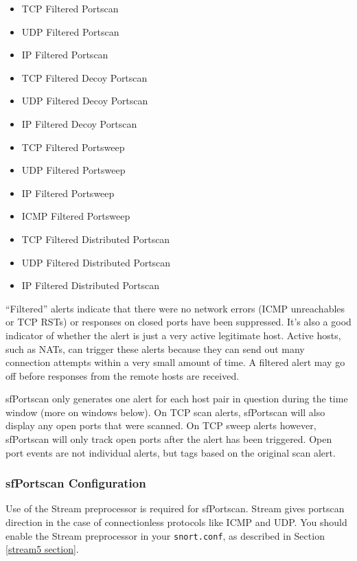 \documentclass[english]{report}
\begin{document}
\begin{itemize}
\item TCP Filtered Portscan
\item UDP Filtered Portscan
\item IP Filtered Portscan

\item TCP Filtered Decoy Portscan
\item UDP Filtered Decoy Portscan
\item IP Filtered Decoy Portscan

\item TCP Filtered Portsweep
\item UDP Filtered Portsweep
\item IP Filtered Portsweep
\item ICMP Filtered Portsweep

\item TCP Filtered Distributed Portscan
\item UDP Filtered Distributed Portscan
\item IP Filtered Distributed Portscan
\end{itemize}

``Filtered'' alerts indicate that there were no network errors (ICMP
unreachables or TCP RSTs) or responses on closed ports have been suppressed.
It's also a good indicator of whether the alert is just a very active
legitimate host. Active hosts, such as NATs, can trigger these alerts because
they can send out many connection attempts within a very small amount of time.
A filtered alert may go off before responses from the remote hosts are
received.

sfPortscan only generates one alert for each host pair in question during the
time window (more on windows below). On TCP scan alerts, sfPortscan will also
display any open ports that were scanned. On TCP sweep alerts however,
sfPortscan will only track open ports after the alert has been triggered. Open
port events are not individual alerts, but tags based on the original scan
alert.

\subsubsection{sfPortscan Configuration}

Use of the Stream preprocessor is required for sfPortscan. Stream gives
portscan direction in the case of connectionless protocols like ICMP and UDP.
You should enable the Stream preprocessor in your \texttt{snort.conf}, as
described in Section \ref{stream5 section}.
\end{document}

